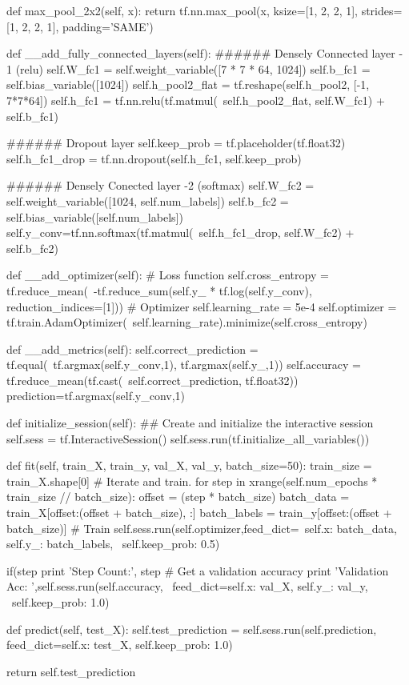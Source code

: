 \documentclass{article}
\begin{document}
\begin{python}
    def max_pool_2x2(self, x):
      return tf.nn.max_pool(x, ksize=[1, 2, 2, 1],
        strides=[1, 2, 2, 1], padding='SAME')


    def __add_fully_connected_layers(self):
        ###### Densely Connected layer - 1 (relu)
        self.W_fc1 = self.weight_variable([7 * 7 * 64, 1024])
        self.b_fc1 = self.bias_variable([1024])
        self.h_pool2_flat = tf.reshape(self.h_pool2, [-1, 7*7*64])
        self.h_fc1 = tf.nn.relu(tf.matmul(\
            self.h_pool2_flat, self.W_fc1) + self.b_fc1)

        ###### Dropout layer
        self.keep_prob = tf.placeholder(tf.float32)
        self.h_fc1_drop = tf.nn.dropout(self.h_fc1, self.keep_prob)

        ###### Densely Conected layer -2 (softmax)
        self.W_fc2 = self.weight_variable([1024, self.num_labels])
        self.b_fc2 = self.bias_variable([self.num_labels])
        self.y_conv=tf.nn.softmax(tf.matmul(\
            self.h_fc1_drop, self.W_fc2) + self.b_fc2)


    def __add_optimizer(self):
        # Loss function
        self.cross_entropy = tf.reduce_mean(\
            -tf.reduce_sum(self.y_ * tf.log(self.y_conv),
                reduction_indices=[1]))
        # Optimizer
        self.learning_rate = 5e-4
        self.optimizer = tf.train.AdamOptimizer(\
            self.learning_rate).minimize(self.cross_entropy)

    def __add_metrics(self):
        self.correct_prediction = tf.equal(\
            tf.argmax(self.y_conv,1), tf.argmax(self.y_,1))
        self.accuracy = tf.reduce_mean(tf.cast(\
            self.correct_prediction, tf.float32))
        prediction=tf.argmax(self.y_conv,1)

    def initialize_session(self):
        ## Create and initialize the interactive session
        self.sess = tf.InteractiveSession()
        self.sess.run(tf.initialize_all_variables())


    def fit(self, train_X, train_y, val_X, val_y, batch_size=50):
        train_size = train_X.shape[0]
        # Iterate and train.
        for step in xrange(self.num_epochs * train_size // batch_size):
            offset = (step * batch_size) %
            batch_data = train_X[offset:(offset + batch_size), :]
            batch_labels = train_y[offset:(offset + batch_size)]
            # Train
            self.sess.run(self.optimizer,feed_dict={\
                self.x: batch_data, self.y_: batch_labels, \
                self.keep_prob: 0.5})

            if(step %
                print 'Step Count:', step
                # Get a validation accuracy
                print 'Validation Acc: ',self.sess.run(self.accuracy, \
                    feed_dict={self.x: val_X, self.y_: val_y, \
                    self.keep_prob: 1.0})

    def predict(self, test_X):
        self.test_prediction = self.sess.run(self.prediction,
                        feed_dict={self.x: test_X, self.keep_prob: 1.0})

        return self.test_prediction
\end{python}
\end{document}
